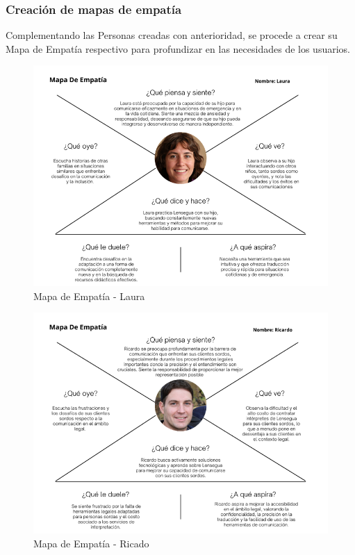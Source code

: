 

\subsubsection{Creación de mapas de empatía}

Complementando las Personas creadas con anterioridad, se procede a crear su Mapa de Empatía respectivo para profundizar en las necesidades de los usuarios. 

\begin{figure} [H]
    \centering
    \includegraphics[width=0.9\linewidth]{figuras/mapa_empatia_laura.png}
    \caption{Mapa de Empatía - Laura}
    \label{fig:enter-label}
\end{figure}

\begin{figure} [H]
    \centering
    \includegraphics[width=0.9\linewidth]{figuras/mapa_empatia_ricardo.png}
    \caption{Mapa de Empatía - Ricado}
    \label{fig:enter-label}
\end{figure}

